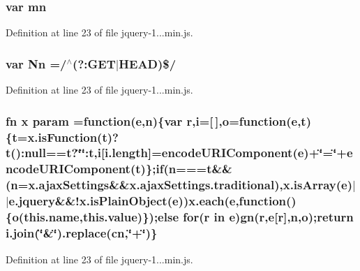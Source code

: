 \subsubsection[{mn}]{\setlength{\rightskip}{0pt plus 5cm}var mn}\label{_scripts_2jquery-1_810_82_8min_8js_a227fb8e4dbaed5a772526c7e9bb0795f}


Definition at line 23 of file jquery-\/1...\+min.\+js.

\hypertarget{_scripts_2jquery-1_810_82_8min_8js_a03586bb881647685652f72d98d189ed0}{}
\subsubsection[{Nn}]{\setlength{\rightskip}{0pt plus 5cm}var Nn =/$^\wedge$(?\+:G\+E\+T$\vert$H\+E\+A\+D)\$/}\label{_scripts_2jquery-1_810_82_8min_8js_a03586bb881647685652f72d98d189ed0}


Definition at line 23 of file jquery-\/1...\+min.\+js.

\hypertarget{_scripts_2jquery-1_810_82_8min_8js_ae8915303d11557d1b001bc56b6195251}{}
\subsubsection[{param}]{ {\bf fn} {\bf x} param =function({\bf e},n)\{var r,{\bf i}=\mbox{[}$\,$\mbox{]},{\bf o}=function({\bf e},{\bf t})\{{\bf t}=x.\+is\+Function({\bf t})?{\bf t}()\+:null=={\bf t}?\char`\"{}\char`\"{}\+:{\bf t},{\bf i}\mbox{[}i.\+length\mbox{]}=encode\+U\+R\+I\+Component({\bf e})+\char`\"{}=\char`\"{}+encode\+U\+R\+I\+Component({\bf t})\};{\bf if}(n==={\bf t}\&\&(n=x.\+ajax\+Settings\&\&x.\+ajax\+Settings.\+traditional),x.\+is\+Array({\bf e})$\vert$$\vert$e.\+jquery\&\&!x.\+is\+Plain\+Object({\bf e})){\bf x.\+each}({\bf e},function()\{{\bf o}(this.\+name,this.\+value)\});{\bf else} for(r in {\bf e}){\bf gn}(r,{\bf e}\mbox{[}r\mbox{]},n,{\bf o});return i.\+join(\char`\"{}\&\char`\"{}).replace({\bf cn},\char`\"{}+\char`\"{})\}}\label{_scripts_2jquery-1_810_82_8min_8js_ae8915303d11557d1b001bc56b6195251}


Definition at line 23 of file jquery-\/1...\+min.\+js.

